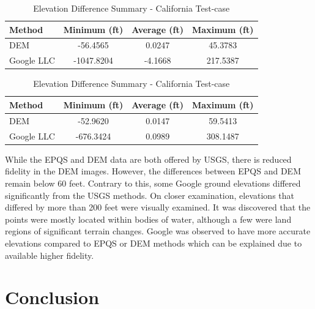 \documentclass[conf]{new-aiaa}
\begin{document}
\begin{table}[htbp]
    \centering
    \begin{minipage}{.45\textwidth}
        \centering
        \caption{\label{tab:table1} Elevation Difference Summary - US Test-case}
        \begin{tabular}{lccc}
        \hline
        \textbf{Method} & \textbf{Minimum (ft)} & \textbf{Average (ft)} & \textbf{Maximum (ft)} \\
        \hline
        DEM & -56.4565 & 0.0247 & 45.3783 \\
        Google LLC & -1047.8204 & -4.1668 & 217.5387 \\
        \hline
        \end{tabular}
    \end{minipage}%
    \hspace{0.06\textwidth}
    \begin{minipage}{.45\textwidth}
        \centering
        \caption{\label{tab:table2} Elevation Difference Summary - California Test-case}
        \begin{tabular}{lccc}
        \hline
        \textbf{Method} & \textbf{Minimum (ft)} & \textbf{Average (ft)} & \textbf{Maximum (ft)} \\
        \hline
        DEM & -52.9620 & 0.0147 & 59.5413 \\
        Google LLC & -676.3424 & 0.0989 & 308.1487 \\
        \hline
        \end{tabular}
    \end{minipage}
\end{table}

\FloatBarrier

While the EPQS and DEM data are both offered by USGS, there is reduced fidelity in the DEM images. However, the differences between EPQS and DEM remain below 60 feet.  Contrary to this, some Google ground elevations differed significantly from the USGS methods.  On closer examination, elevations that differed by more than 200 feet were visually examined.  It was discovered that the points were mostly located within bodies of water, although a few were land regions of significant terrain changes.  Google was observed to have more accurate elevations compared to EPQS or DEM methods which can be explained due to available higher fidelity.

\FloatBarrier

\section{Conclusion}
\end{document}
